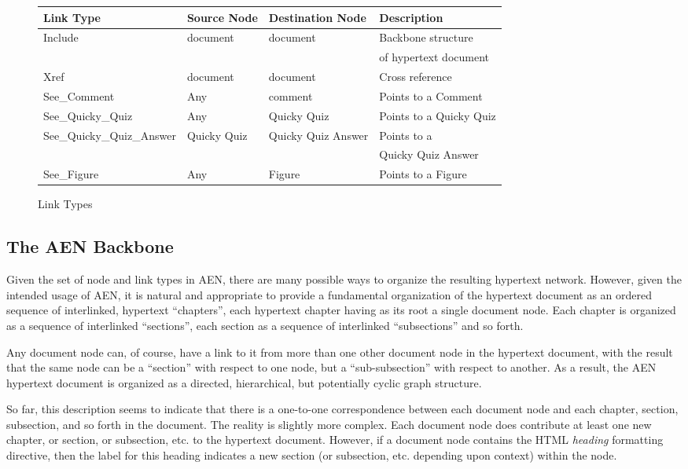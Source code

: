 \begin{figure*}
\begin{center}
\begin{tabular}{|l|l|l|l|}
\hline
Link Type&Source Node&Destination Node&Description\\ \hline \hline
Include&document&document&Backbone structure \\
&&&of hypertext document\\ \hline
Xref&document&document&Cross reference\\ \hline
See\_Comment&Any&comment&Points to a Comment\\ \hline
See\_Quicky\_Quiz&Any&Quicky Quiz&Points to a Quicky Quiz\\ \hline
See\_Quicky\_Quiz\_Answer&Quicky Quiz&Quicky Quiz Answer&Points to a \\
&&&Quicky Quiz Answer\\ \hline
See\_Figure&Any&Figure&Points to a Figure\\ \hline
\end{tabular}
\end{center}
\label{table:link-types}
\caption{Link Types}
\end{figure*}


\subsection{The AEN Backbone}
\label{sec:aen-backbone}

Given the set of node and link types in AEN, there are many possible ways
to organize the resulting hypertext network.  However, given the intended
usage of AEN, it is natural and appropriate to provide a fundamental
organization of the hypertext document as an ordered sequence of
interlinked, hypertext ``chapters'', each hypertext chapter having as its
root a single document node.  Each chapter is organized as a sequence of
interlinked ``sections'', each section as a sequence of interlinked
``subsections'' and so forth.

Any document node can, of course, have a link to it from more
than one other document node in the hypertext document, with the result that the
same node can be a ``section'' with respect to one node, but a
``sub-subsection'' with respect to another.  As a result, the AEN hypertext document
is organized as a directed, hierarchical, but potentially cyclic graph structure.

So far, this description seems to indicate that there is a one-to-one
correspondence between each document node and each chapter, section,
subsection, and so forth in the document.  The reality is slightly more
complex.  Each document node does contribute at least one new chapter, or
section, or subsection, etc. to the hypertext document.  However, if a document
node contains the HTML {\em heading} formatting directive, then the label for
this heading indicates a new section (or subsection, etc. depending upon
context) within the node.

